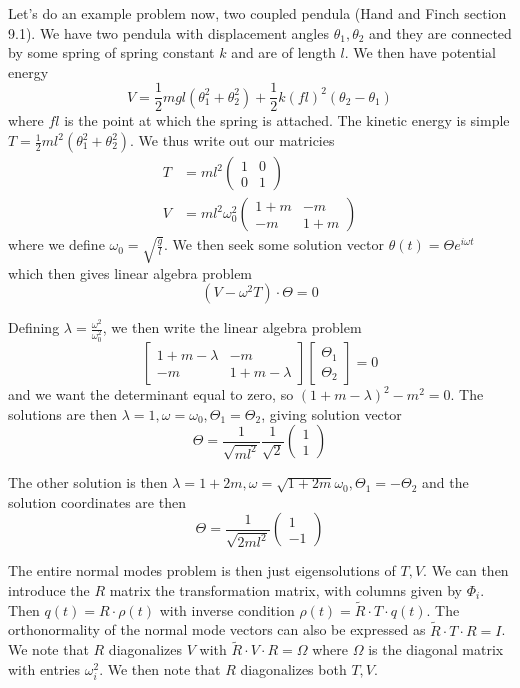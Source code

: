 \documentclass[10pt]{report}
\begin{document}
Let's do an example problem now, two coupled pendula (Hand and Finch section 9.1). We have two pendula with displacement angles $\theta_1, \theta_2$ and they are connected by some spring of spring constant $k$ and are of length $l$. We then have potential energy
$$V = \frac{1}{2}mgl\left( \theta_1^2 + \theta_2^2 \right)  + \frac{1}{2}k(fl)^2(\theta_2 - \theta_1)$$
where $fl$ is the point at which the spring is attached. The kinetic energy is simple $T = \frac{1}{2}ml^2(\theta_1^2 + \theta_2^2)$. We thus write out our matricies
\begin{align*}
    T &= ml^2\begin{pmatrix} 1&0\\0&1 \end{pmatrix} \\
    V &= ml^2\omega_0^2 \begin{pmatrix} 1+m & -m \\ -m & 1+m \end{pmatrix} 
\end{align*}
where we define $\omega_0 = \sqrt{\frac{g}{l}}$. We then seek some solution vector $\theta(t) = \Theta e^{i\omega t}$ which then gives linear algebra problem
$$(V - \omega^2 T) \cdot \Theta = 0$$

Defining $\lambda = \frac{\omega^2}{\omega_0^2}$, we then write the linear algebra problem
$$\begin{bmatrix} 1+m-\lambda & -m \\ -m & 1+m-\lambda \end{bmatrix} \begin{bmatrix} \Theta_1\\ \Theta_2 \end{bmatrix}  = 0$$
and we want the determinant equal to zero, so $\left( 1+m-\lambda \right)^2 - m^2 = 0$. The solutions are then $\lambda = 1, \omega = \omega_0, \Theta_1 = \Theta_2$, giving solution vector
$$\Theta = \frac{1}{\sqrt{ml^2}}\frac{1}{\sqrt{2}}\begin{pmatrix} 1\\1 \end{pmatrix} $$

The other solution is then $\lambda = 1+2m, \omega = \sqrt{1+2m}\omega_0, \Theta_1 = -\Theta_2$ and the solution coordinates are then
$$\Theta = \frac{1}{\sqrt{2ml^2}}\begin{pmatrix} 1\\-1 \end{pmatrix} $$

The entire normal modes problem is then just eigensolutions of $T,V$. We can then introduce the $R$ matrix the transformation matrix, with columns given by $\Phi_i$. Then $q(t) = R\cdot \rho(t)$ with inverse condition $\rho(t) = \tilde{R}\cdot T \cdot q(t)$. The orthonormality of the normal mode vectors can also be expressed as $\tilde{R}\cdot T \cdot R = I$. We note that $R$ diagonalizes $V$ with $\tilde{R}\cdot V \cdot R = \Omega$ where $\Omega$ is the diagonal matrix with entries $\omega_i^2$. We then note that $R$ diagonalizes both $T,V$. 
\end{document}
